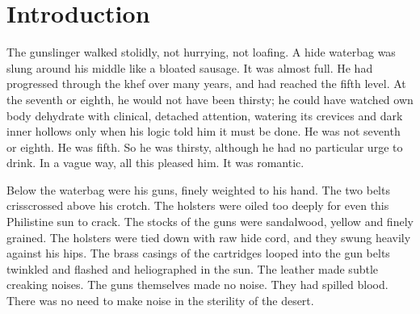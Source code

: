 \documentclass[
11pt,%
tightenlines,%
twoside,%
onecolumn,%
nofloats,%
nobibnotes,%
nofootinbib,%
superscriptaddress,%
noshowpacs,%
centertags]%
{revtex4}
\begin{document}
\maketitle


\section{Introduction}

The gunslinger walked stolidly, not hurrying, not loafing. A hide waterbag was slung around his middle like a bloated sausage. It was almost full. He had progressed through the khef over many years, and had reached the fifth level. At the seventh or eighth, he would not have been thirsty; he could have watched own body dehydrate with clinical, detached attention, watering its crevices and dark inner hollows only when his logic told him it must be done. He was not seventh or eighth. He was fifth. So he was thirsty, although he had no particular urge to drink. In a vague way, all this pleased him. It was romantic.

Below the waterbag were his guns, finely weighted to his hand. The two belts crisscrossed above his crotch. The holsters were oiled too deeply for even this Philistine sun to crack. The stocks of the guns were sandalwood, yellow and finely grained. The holsters were tied down with raw hide cord, and they swung heavily against his hips. The brass casings of the cartridges looped into the gun belts twinkled and flashed and heliographed in the sun. The leather made subtle creaking noises. The guns themselves made no noise. They had spilled blood. There was no need to make noise in the sterility of the desert.
\end{document}
